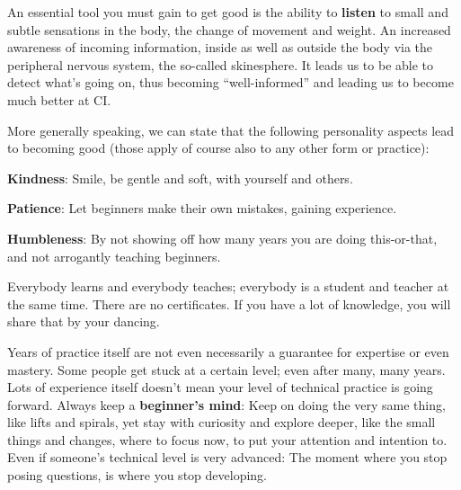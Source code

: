 An essential tool you must gain to get good is the ability to \textbf{listen} to small and subtle sensations in the body, the change of movement and weight.
An increased awareness of incoming information, inside as well as outside the body via the peripheral nervous system, the so-called \gls{skinesphere}.
It leads us to be able to detect what's going on, thus becoming ``well-informed'' and leading us to become much better at CI.

More generally speaking, we can state that the following personality aspects lead to becoming good (those apply of course also to any other form or practice):

\begin{itemize*}
    \item [] \textbf{Kindness}: Smile, be gentle and soft, with yourself and others.
    \item [] \textbf{Patience}: Let beginners make their own mistakes, gaining experience.
    \item [] \textbf{Humbleness}: By not showing off how many years you are doing this-or-that, and not arrogantly teaching beginners.
\end{itemize*}

Everybody learns and everybody teaches; everybody is a student and teacher at the same time.
There are no certificates.
If you have a lot of knowledge, you will share that by your dancing.

Years of practice itself are not even necessarily a guarantee for expertise or even mastery.
Some people get stuck at a certain level; even after many, many years.
Lots of experience itself doesn't mean your level of technical practice is going forward.
Always keep a \textbf{beginner's mind}: Keep on doing the very same thing, like lifts and spirals, yet stay with curiosity and explore deeper, like the small things and changes, where to focus now, to put your attention and intention to.
Even if someone's technical level is very advanced: The moment where you stop posing questions, is where you stop developing.